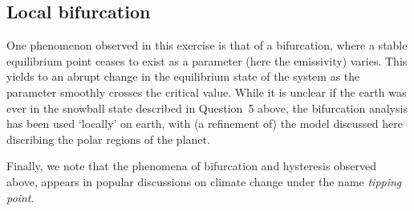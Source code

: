 \documentclass[10pt, letterpaper, answer]{exam}
\begin{document}
\subsection{Local bifurcation}

One phenomenon observed in this exercise is that of a bifurcation, where a stable equilibrium point ceases to exist as a parameter (here the emissivity) varies. This yields to an abrupt change in the equilibrium state of the system as the parameter smoothly crosses the critical value. While it is unclear if the earth was ever in the snowball state described in Question~5 above, the bifurcation analysis has been used `locally' on earth, with (a refinement of) the model discussed here discribing the polar regions of the planet.

Finally, we note that the phenomena of bifurcation and hysteresis observed above, appears in popular discussions on climate change under the name \emph{tipping point}.
\end{document}
